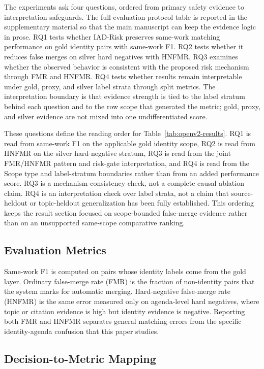 \documentclass[preprint,12pt]{elsarticle}
\begin{document}
The experiments ask four questions, ordered from primary safety evidence to interpretation safeguards. The full evaluation-protocol table is reported in the supplementary material so that the main manuscript can keep the evidence logic in prose. RQ1 tests whether IAD-Risk preserves same-work matching performance on gold identity pairs with same-work F1. RQ2 tests whether it reduces false merges on silver hard negatives with HNFMR. RQ3 examines whether the observed behavior is consistent with the proposed risk mechanism through FMR and HNFMR. RQ4 tests whether results remain interpretable under gold, proxy, and silver label strata through split metrics. The interpretation boundary is that evidence strength is tied to the label stratum behind each question and to the row scope that generated the metric; gold, proxy, and silver evidence are not mixed into one undifferentiated score.

These questions define the reading order for Table~\ref{tab:openv2-results}. RQ1 is read from same-work F1 on the applicable gold identity scope, RQ2 is read from HNFMR on the silver hard-negative stratum, RQ3 is read from the joint FMR/HNFMR pattern and risk-gate interpretation, and RQ4 is read from the Scope type and label-stratum boundaries rather than from an added performance score. RQ3 is a mechanism-consistency check, not a complete causal ablation claim. RQ4 is an interpretation check over label strata, not a claim that source-heldout or topic-heldout generalization has been fully established. This ordering keeps the result section focused on scope-bounded false-merge evidence rather than on an unsupported same-scope comparative ranking.

\subsection{Evaluation Metrics}

Same-work F1 is computed on pairs whose identity labels come from the gold layer. Ordinary false-merge rate (FMR) is the fraction of non-identity pairs that the system marks for automatic merging. Hard-negative false-merge rate (HNFMR) is the same error measured only on agenda-level hard negatives, where topic or citation evidence is high but identity evidence is negative. Reporting both FMR and HNFMR separates general matching errors from the specific identity-agenda confusion that this paper studies.

\subsection{Decision-to-Metric Mapping}
\end{document}
